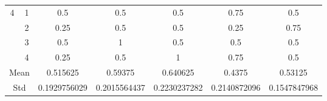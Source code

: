 \documentclass[draft,dvipsnames]{drexel-thesis}
\begin{document}
\begin{thesis}
\begin{table}[!t]
\begin{tabular}{|c|c|c|c|c|c|c|}
\multirow{4}{*}{4}    & 1                   & 0.5          & 0.5          & 0.5          & 0.75         & 0.5          \\ \cline{2-7}
                      & 2                   & 0.25         & 0.5          & 0.5          & 0.25         & 0.75         \\ \cline{2-7}
                      & 3                   & 0.5          & 1            & 0.5          & 0.5          & 0.5          \\ \cline{2-7}
                      & 4                   & 0.25         & 0.5          & 1            & 0.75         & 0.5          \\ \hline
\multicolumn{2}{|c|}{Mean}                  & 0.515625     & 0.59375      & 0.640625     & 0.4375       & 0.53125      \\ \hline
\multicolumn{2}{|c|}{Std}                   & 0.1929756029 & 0.2015564437 & 0.2230237282 & 0.2140872096 & 0.1547847968 \\ \hline
\end{tabular}
\end{table}


\end{thesis}
\end{document}
